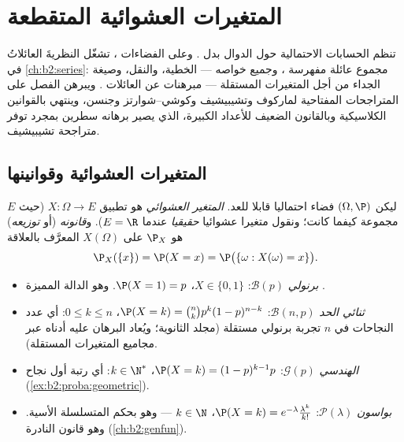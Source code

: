 \chapter{المتغيرات العشوائية المتقطعة}\label{ch:b2:randomvar}

تنظم  الحسابات الاحتمالية حول الدوال بدل .
وعلى الفضاءات ، تشغّل النظريةَ العائلاتُ  في
\cref{ch:b2:series}:  مجموع عائلة مفهرسة ، وجميع
خواصه --- الخطية، والنقل، وصيغة الجداء من أجل المتغيرات المستقلة ---
مبرهنات عن العائلات . ويبرهن الفصل على المتراجحات
المفتاحية لماركوف وتشيبيشيف وكوشي--شوارتز وجنسن، وينتهي بالقوانين
الكلاسيكية وبالقانون الضعيف للأعداد الكبيرة، الذي يصير برهانه سطرين
بمجرد توفر متراجحة تشيبيشيف.

\section{المتغيرات العشوائية وقوانينها}

\begin{definition}\label{def:b2:randomvar:law}
ليكن $(\Omega, \P)$ فضاء احتماليا قابلا للعد. \emph{المتغير العشوائي}
هو تطبيق $X \colon \Omega \to E$ (حيث $E$ مجموعة كيفما كانت؛ ونقول متغيرا عشوائيا
\emph{حقيقيا} عندما $E = \R$). و\emph{قانونه}
(أو \emph{توزيعه}) هو  $\P_X$ على
 $X(\Omega)$ المعرَّف بالعلاقة
\[
\P_X(\{x\}) = \P(X = x)
= \P\bigl(\{\omega : X(\omega) = x\}\bigr) .
\]
\end{definition}

\begin{example}\label{ex:b2:randomvar:laws}
\leavevmode
\begin{itemize}
\item \emph{برنولي} $\mathcal{B}(p)$: $X \in \{0, 1\}$، $\P(X =
1) = p$. وهو الدالة المميزة .
\item \emph{ثنائي الحد} $\mathcal{B}(n, p)$: $\P(X = k) =
\binom nk p^k(1-p)^{n-k}$، $0 \leq k \leq n$: أي عدد النجاحات في
$n$ تجربة برنولي مستقلة (مجلد الثانوية؛ ويُعاد البرهان عليه أدناه
عبر مجاميع المتغيرات المستقلة).
\item \emph{الهندسي} $\mathcal{G}(p)$: $\P(X = k) =
(1-p)^{k-1}p$، $k \in \N^*$: أي رتبة أول نجاح
(\cref{ex:b2:proba:geometric}).
\item \emph{بواسون} $\mathcal{P}(\lambda)$: $\P(X = k) =
e^{-\lambda}\frac{\lambda^k}{k!}$، $k \in \N$ --- وهو 
بحكم المتسلسلة الأسية. وهو قانون  النادرة (\cref{ch:b2:genfun}).
\end{itemize}
\end{example}


